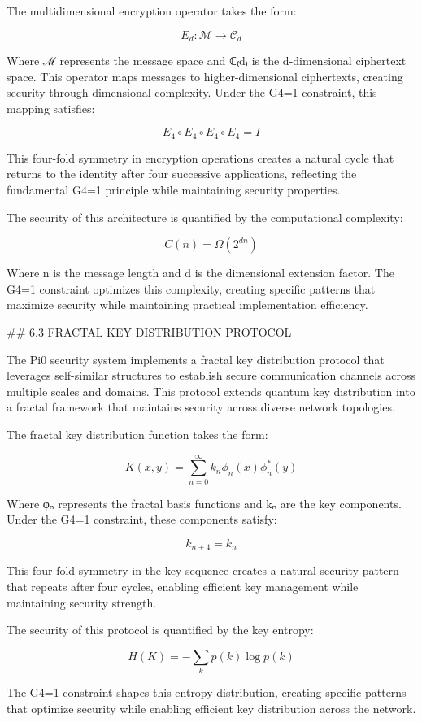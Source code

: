 The multidimensional encryption operator takes the form:

$$E_d: \mathcal{M} \rightarrow \mathcal{C}_d$$

Where ℳ represents the message space and ℂ₍d₎ is the d-dimensional ciphertext space. This operator maps messages to higher-dimensional ciphertexts, creating security through dimensional complexity. Under the G4=1 constraint, this mapping satisfies:

$$E_4 \circ E_4 \circ E_4 \circ E_4 = I$$

This four-fold symmetry in encryption operations creates a natural cycle that returns to the identity after four successive applications, reflecting the fundamental G4=1 principle while maintaining security properties.

The security of this architecture is quantified by the computational complexity:

$$C(n) = \Omega(2^{dn})$$

Where n is the message length and d is the dimensional extension factor. The G4=1 constraint optimizes this complexity, creating specific patterns that maximize security while maintaining practical implementation efficiency.

## 6.3 FRACTAL KEY DISTRIBUTION PROTOCOL

The Pi0 security system implements a fractal key distribution protocol that leverages self-similar structures to establish secure communication channels across multiple scales and domains. This protocol extends quantum key distribution into a fractal framework that maintains security across diverse network topologies.

The fractal key distribution function takes the form:

$$K(x, y) = \sum_{n=0}^{\infty} k_n \phi_n(x) \phi_n^*(y)$$

Where φₙ represents the fractal basis functions and kₙ are the key components. Under the G4=1 constraint, these components satisfy:

$$k_{n+4} = k_n$$

This four-fold symmetry in the key sequence creates a natural security pattern that repeats after four cycles, enabling efficient key management while maintaining security strength.

The security of this protocol is quantified by the key entropy:

$$H(K) = -\sum_k p(k) \log p(k)$$

The G4=1 constraint shapes this entropy distribution, creating specific patterns that optimize security while enabling efficient key distribution across the network.

